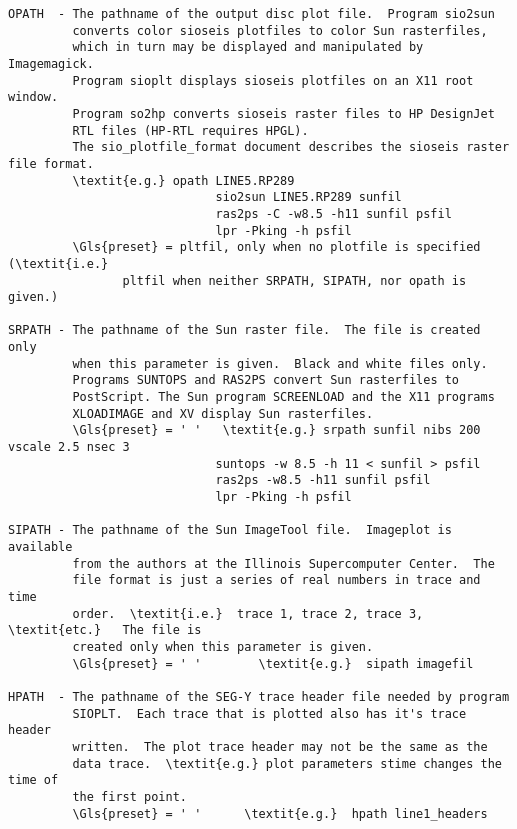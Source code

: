 \begin{verbatim}
OPATH  - The pathname of the output disc plot file.  Program sio2sun
         converts color sioseis plotfiles to color Sun rasterfiles,
         which in turn may be displayed and manipulated by Imagemagick.
         Program sioplt displays sioseis plotfiles on an X11 root window.
         Program so2hp converts sioseis raster files to HP DesignJet
         RTL files (HP-RTL requires HPGL).
         The sio_plotfile_format document describes the sioseis raster file format.
         \textit{e.g.} opath LINE5.RP289
                             sio2sun LINE5.RP289 sunfil
                             ras2ps -C -w8.5 -h11 sunfil psfil
                             lpr -Pking -h psfil
         \Gls{preset} = pltfil, only when no plotfile is specified (\textit{i.e.}
                pltfil when neither SRPATH, SIPATH, nor opath is given.)

SRPATH - The pathname of the Sun raster file.  The file is created only
         when this parameter is given.  Black and white files only.
         Programs SUNTOPS and RAS2PS convert Sun rasterfiles to
         PostScript. The Sun program SCREENLOAD and the X11 programs
         XLOADIMAGE and XV display Sun rasterfiles.
         \Gls{preset} = ' '   \textit{e.g.} srpath sunfil nibs 200 vscale 2.5 nsec 3
                             suntops -w 8.5 -h 11 < sunfil > psfil
                             ras2ps -w8.5 -h11 sunfil psfil
                             lpr -Pking -h psfil

SIPATH - The pathname of the Sun ImageTool file.  Imageplot is available
         from the authors at the Illinois Supercomputer Center.  The
         file format is just a series of real numbers in trace and time
         order.  \textit{i.e.}  trace 1, trace 2, trace 3, \textit{etc.}   The file is
         created only when this parameter is given.
         \Gls{preset} = ' '        \textit{e.g.}  sipath imagefil

HPATH  - The pathname of the SEG-Y trace header file needed by program
         SIOPLT.  Each trace that is plotted also has it's trace header
         written.  The plot trace header may not be the same as the
         data trace.  \textit{e.g.} plot parameters stime changes the time of
         the first point.
         \Gls{preset} = ' '      \textit{e.g.}  hpath line1_headers


\end{verbatim}
